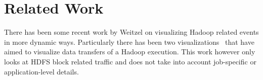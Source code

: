 \section{Related Work}
\label{sec:rw}

There has been some recent work by Weitzel on visualizing Hadoop related events in 
more dynamic ways. Particularly there has been two visualizations~\cite{HadoopViz1, HadoopViz2} that
have aimed to visualize data transfers of a Hadoop execution. This work however only looks at HDFS 
block related traffic and does not take into account job-specific or application-level details. 
